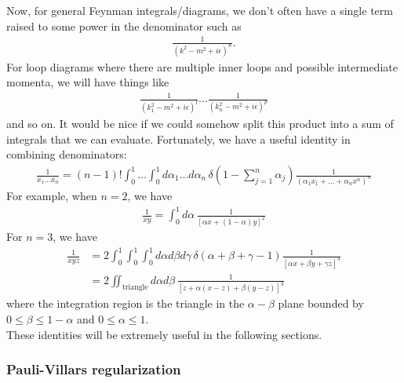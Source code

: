 \documentclass{book}
\theoremstyle{definition}
\newcommand{\f}[2]{\frac{#1}{#2}}
\newcommand{\lp}{\left(}
\newcommand{\rp}{\right)}
\begin{document}
Now, for general Feynman integrals/diagrams, we don't often have a single term raised to some power in the denominator such as
\begin{align}
\f{1}{(k^2 - m^2 + i\epsilon)^n}.
\end{align}
For loop diagrams where there are multiple inner loops and possible intermediate momenta, we will have things like
\begin{align}
\f{1}{(k_1^2 - m^2 + i\epsilon)^l} \dots \f{1}{(k_n^2 - m^2 + i\epsilon)^p}
\end{align}
and so on. It would be nice if we could somehow split this product into a sum of integrals that we can evaluate. Fortunately, we have a useful identity in combining denominators:
\begin{align}
\boxed{\f{1}{x_1\dots x_n} = (n-1)! \int^1_0\dots \int^1_0 d\alpha_1\dots d\alpha_n \, \delta\lp 1 - \sum^n_{j=1} \alpha_j \rp \f{1}{(\alpha_1 x_1 + \dots + \alpha_n x^n)^n}}
\end{align}
For example, when $n=2$, we have
\begin{align}
\boxed{\f{1}{xy} = \int^1_0 d\alpha \, \f{1}{[\alpha x +(1-\alpha)y]^2}}
\end{align}
For $n=3$, we have
\begin{align}
\boxed{\f{1}{xyz}} &= 2\int^1_0 \int^1_0 \int^1_0 d\alpha d\beta d\gamma\, \delta(\alpha + \beta + \gamma - 1) \f{1}{[\alpha x + \beta y + \gamma z]^3} \nonumber\\
&= \boxed{2\iint_{\text{triangle}} d\alpha d\beta\, \f{1}{[z + \alpha(x-z) + \beta(y -z)]^3}}
\end{align}
where the integration region is the triangle in the $\alpha-\beta$ plane bounded by $0 \leq \beta \leq 1 - \alpha$ and $0 \leq \alpha \leq 1$. \\

These identities will be extremely useful in the following sections.
















\subsubsection{Pauli-Villars regularization}
\end{document}
